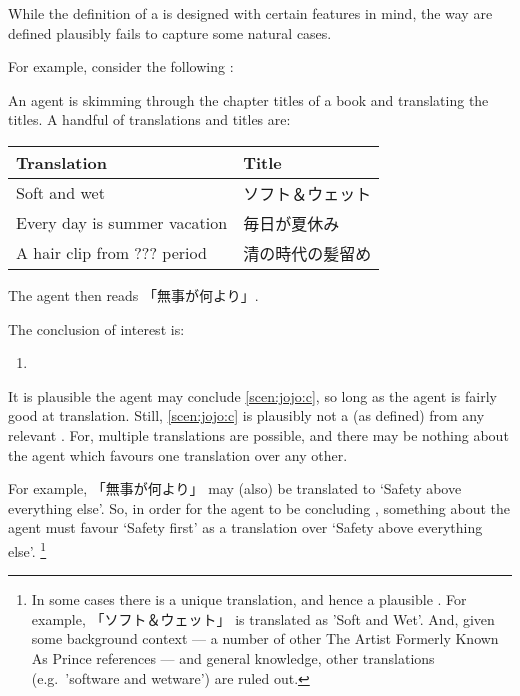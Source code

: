 \begin{note}
  While the definition of a  is designed with certain features in mind, the way  are defined plausibly fails to capture some natural cases.

  For example, consider the following :

  \begin{scenario}[ジョジョリオン]%
    \label{scen:jojo}
    \nocite{huangmufeiluyan:2011aa}%
    An agent is skimming through the chapter titles of a book and translating the titles.
    A handful of translations and titles are:

    \begin{center}
      \bgroup
      \def\arraystretch{1.125}
      \begin{tabular}{R{.45\textwidth} L{.45\textwidth}}
        Translation & Title \\
        \hline
        Soft and wet & ソフト＆ウェット \\
        Every day is summer vacation & 毎日が夏休み \\
        A hair clip from ??? period & 清の時代の髪留め \\
      \end{tabular}
      \egroup
    \end{center}

    \noindent%
    The agent then reads 「無事が何より」.
  \end{scenario}

  \noindent%
  The conclusion of interest is:
  \begin{enumerate}[label=C\thescenarioCounter., ref=C\thescenarioCounter]
  \item
    \label{scen:jojo:c}
  \end{enumerate}

  \noindent%
  It is plausible the agent may conclude \ref{scen:jojo:c}, so long as the agent is fairly good at translation.
  Still, \ref{scen:jojo:c} is plausibly not a \fc{} (as defined) from any relevant \pool{}.
  For, multiple translations are possible, and there may be nothing about the agent which favours one translation over any other.

  For example, 「無事が何より」 may (also) be translated to `Safety above everything else'.
  So, in order for the agent to be concluding , something about the agent must favour `Safety first' as a translation over `Safety above everything else'.%
  \footnote{
    In some cases there is a unique translation, and hence a plausible \fc{}.
    For example, 「ソフト＆ウェット」 is translated as 'Soft and Wet'.
    And, given some background context --- a number of other The Artist Formerly Known As Prince references --- and general knowledge, other translations (e.g.\ 'software and wetware') are ruled out.
  }
\end{note}

